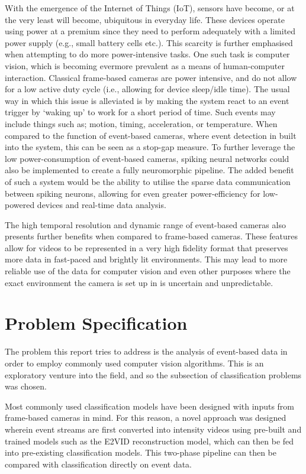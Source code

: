 With the emergence of the Internet of Things (IoT), sensors have become, or at the very least will become, ubiquitous in everyday life. These devices operate using power at a premium since they need to perform adequately with a limited power supply (e.g., small battery cells etc.). This scarcity is further emphasised when attempting to do more power-intensive tasks. One such task is computer vision, which is becoming evermore prevalent as a means of human-computer interaction. Classical frame-based cameras are power intensive, and do not allow for a low active duty cycle (i.e., allowing for device sleep/idle time). The usual way in which this issue is alleviated is by making the system react to an event trigger by `waking up' to work for a short period of time. Such events may include things such as; motion, timing, acceleration, or temperature. When compared to the function of event-based cameras, where event detection in built into the system, this can be seen as a stop-gap measure. To further leverage the low power-consumption of event-based cameras, spiking neural networks could also be implemented to create a fully neuromorphic pipeline. The added benefit of such a system would be the ability to utilise the sparse data communication between spiking neurons, allowing for even greater power-efficiency for low-powered devices and real-time data analysis.

The high temporal resolution and dynamic range of event-based cameras also presents further benefits when compared to frame-based cameras. These features allow for videos to be represented in a very high fidelity format that preserves more data in fast-paced and brightly lit environments. This may lead to more reliable use of the data for computer vision and even other purposes where the exact environment the camera is set up in is uncertain and unpredictable.

\section{Problem Specification}

The problem this report tries to address is the analysis of event-based data in order to employ commonly used computer vision algorithms. This is an exploratory venture into the field, and so the subsection of classification problems was chosen. 

Most commonly used classification models have been designed with inputs from frame-based cameras in mind. For this reason, a novel approach was designed wherein event streams are first converted into intensity videos using pre-built and trained models such as the E2VID reconstruction model\cite{spikingToVideo}, which can then be fed into pre-existing classification models. This two-phase pipeline can then be compared with classification directly on event data.

